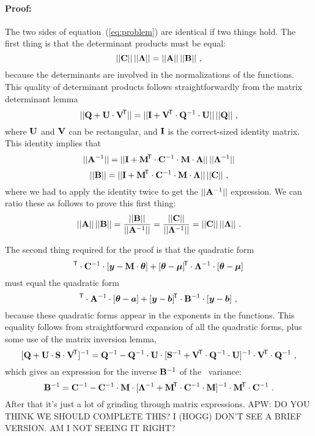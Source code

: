 \paragraph{Proof:}
The two sides of equation~(\ref{eq:problem}) are identical if two things hold.
The first thing is that the determinant products must be equal:
\begin{equation}
||\mathbf{C}||\,||\mathbf{\Lambda}|| = ||\mathbf{A}||\,||\mathbf{B}||
~ ,
\end{equation}
because the determinants are involved in the normalizations of the
functions.
This quality of determinant products follows straightforwardly from
the matrix determinant lemma
\begin{equation}\label{eq:detlemma}
||\mathbf{Q} + \mathbf{U}\cdot\mathbf{V}^{\!\mathsf{T}}|| = ||\mathbf{I} + \mathbf{V}^{\!\mathsf{T}}\cdot\mathbf{Q}^{-1}\cdot\mathbf{U}||\,||\mathbf{Q}||
~ ,
\end{equation}
where $\mathbf{U}$ and $\mathbf{V}$ can be rectangular, and $\mathbf{I}$ is the correct-sized identity matrix.
This identity implies that
\begin{equation}
||\mathbf{A}^{-1}|| = ||\mathbf{I} + \mathbf{M}^{\!\mathsf{T}}\cdot\mathbf{C}^{-1}\cdot\mathbf{M}\cdot\mathbf{\Lambda}||\,||\mathbf{\Lambda}^{-1}||
\end{equation}
\begin{equation}
||\mathbf{B}||     = ||\mathbf{I} + \mathbf{M}^{\!\mathsf{T}}\cdot\mathbf{C}^{-1}\cdot\mathbf{M}\cdot\mathbf{\Lambda}||\,||\mathbf{C}||
~,
\end{equation}
where we had to apply the identity twice to get the $||\mathbf{A}^{-1}||$ expression.
We can ratio these as follows to prove this first thing:
\begin{equation}
||\mathbf{A}||\,||\mathbf{B}||
 = \frac{||\mathbf{B}||}{||\mathbf{A}^{-1}||}
 = \frac{||\mathbf{C}||}{||\mathbf{\Lambda}^{-1}||}
 = ||\mathbf{C}||\,||\mathbf{\Lambda}||
~ .
\end{equation}

The second thing required for the proof is that the quadratic form
\begin{equation}
[\vy-\mM\cdot\vtheta]\T\cdot\tC\inv\cdot[\vy-\mM\cdot\vtheta]
+ [\vtheta-\vmu]\T\cdot\tLambda\inv\cdot[\vtheta-\vmu]
\end{equation}
must equal the quadratic form
\begin{equation}
[\vtheta-\va]\T\cdot\tA\inv\cdot[\vtheta-\va]
+ [\vy-\vb]\T\cdot\tB\inv\cdot[\vy-\vb]
~,
\end{equation}
because these quadratic forms appear in the exponents in the functions.
This equality follows from straightforward expansion of
all the quadratic forms, plus some use of the matrix inversion lemma,
\begin{equation}\label{eq:invlemma}
[\mathbf{Q} + \mathbf{U}\cdot\mathbf{S}\cdot\mathbf{V}^{\!\mathsf{T}}]^{-1} = \mathbf{Q}^{-1} - \mathbf{Q}^{-1}\cdot\mathbf{U}\cdot[\mathbf{S}^{-1} + \mathbf{V}^{\!\mathsf{T}}\cdot\mathbf{Q}^{-1}\cdot\mathbf{U}]^{-1}\cdot\mathbf{V}^{\!\mathsf{T}}\cdot\mathbf{Q}^{-1}
~ ,
\end{equation}
which gives an expression for the inverse $\mathbf{B}^{-1}$ of the \FML\ variance:
\begin{equation}
\mathbf{B}^{-1} = \mathbf{C}^{-1} - \mathbf{C}^{-1}\cdot\mathbf{M}\cdot[\mathbf{\Lambda}^{-1} + \mathbf{M}^{\!\mathsf{T}}\cdot\mathbf{C}^{-1}\cdot\mathbf{M}]^{-1}\cdot\mathbf{M}^{\!\mathsf{T}}\cdot\mathbf{C}^{-1}
~ .
\end{equation}
After that it's just a lot of grinding through matrix expressions.
APW: DO YOU THINK WE SHOULD COMPLETE THIS? I (HOGG) DON'T SEE A BRIEF VERSION.
AM I NOT SEEING IT RIGHT?

